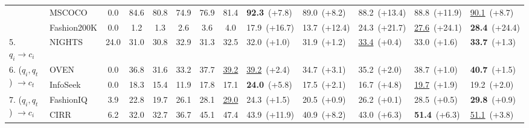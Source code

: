 \begin{table}
{\begin{tabular}{ll|c|ccccc|lllll}
         & MSCOCO                & 0.0& 84.6 & 80.8 & 74.9 & 76.9 & 81.4  & \textbf{92.3}~\textcolor{positive}{\large (+7.8)} & 89.0~\textcolor{positive}{\large (+8.2)}& 88.2~\textcolor{positive}{\large (+13.4)}& 88.8~\textcolor{positive}{\large (+11.9)}& \underline{90.1}~\textcolor{positive}{\large (+8.7)}\\
         & Fashion200K          & 0.0& 1.2 & 1.3 & 2.6 & 3.6 & 4.0  & 17.9~\textcolor{positive}{\large (+16.7)} & 13.7~\textcolor{positive}{\large (+12.4)}& 24.3~\textcolor{positive}{\large (+21.7)}& \underline{27.6}~\textcolor{positive}{\large (+24.1)}& \textbf{28.4}~\textcolor{positive}{\large (+24.4)}\\
         \midrule
         5. $q_i \to c_i$
         & NIGHTS     & 24.0& 31.0 & 30.8 & 32.9 & 31.3 & 32.5  & 32.0~\textcolor{positive}{\large (+1.0)} & 31.9~\textcolor{positive}{\large (+1.2)}& \underline{33.4}~\textcolor{positive}{\large (+0.4)}& 33.0~\textcolor{positive}{\large (+1.6)}& \textbf{33.7}~\textcolor{positive}{\large (+1.3)}\\
         \midrule
         \multirow{2}{*}{6. ($q_i, q_t$) $\to c_t$}
         & OVEN                        & 0.0& 36.8 & 31.6 & 33.2 & 37.7 & \underline{39.2}  & \underline{39.2}~\textcolor{positive}{\large (+2.4)} & 34.7~\textcolor{positive}{\large (+3.1)}& 35.2~\textcolor{positive}{\large (+2.0)}& 38.7~\textcolor{positive}{\large (+1.0)}& \textbf{40.7}~\textcolor{positive}{\large (+1.5)}\\
         & InfoSeek                & 0.0& 18.3 & 15.4 & 11.9 & 17.8 & 17.1  & \textbf{24.0}~\textcolor{positive}{\large (+5.8)} & 17.5~\textcolor{positive}{\large (+2.1)}& 16.7~\textcolor{positive}{\large (+4.8)}& \underline{19.7}~\textcolor{positive}{\large (+1.9)}& 19.2~\textcolor{positive}{\large (+2.0)}\\
         \midrule
         \multirow{2}{*}{7. ($q_i, q_t$) $\to c_i$}
         & FashionIQ                & 3.9& 22.8 & 19.7 & 26.1 & 28.1 & \underline{29.0}  & 24.3~\textcolor{positive}{\large (+1.5)} & 20.5~\textcolor{positive}{\large (+0.9)}& 26.2~\textcolor{positive}{\large (+0.1)}& 28.5~\textcolor{positive}{\large (+0.5)}& \textbf{29.8}~\textcolor{positive}{\large (+0.9)}\\
         & CIRR                     & 6.2& 32.0 & 32.7 & 36.7 & 45.1 & 47.4  & 43.9~\textcolor{positive}{\large (+11.9)} & 40.9~\textcolor{positive}{\large (+8.2)}& 43.0~\textcolor{positive}{\large (+6.3)}& \textbf{51.4}~\textcolor{positive}{\large (+6.3)}& \underline{51.1}~\textcolor{positive}{\large (+3.8)}\\

\end{tabular}}
\end{table}
